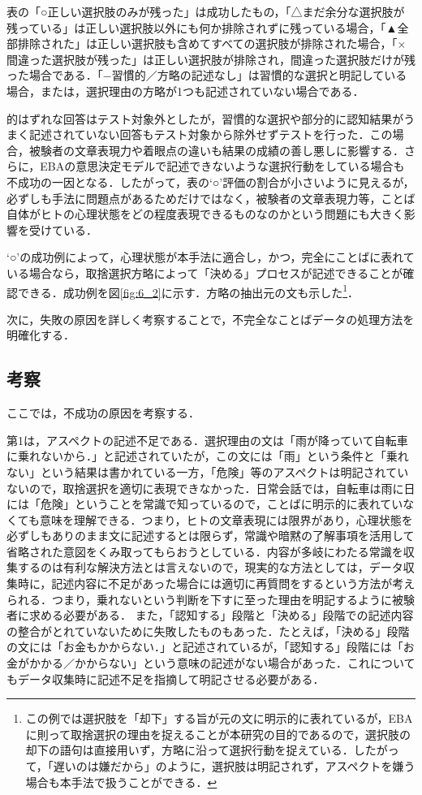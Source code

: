 \documentclass[japanese]{jnlp_1.3a}
\begin{document}
表の「○正しい選択肢のみが残った」は成功したもの，「△まだ余分な選択肢が残っている」は正しい選択肢以外にも何か排除されずに残っている場合，「▲全部排除された」は正しい選択肢も含めてすべての選択肢が排除された場合，「×間違った選択肢が残った」は正しい選択肢が排除され，間違った選択肢だけが残った場合である．「−習慣的／方略の記述なし」は習慣的な選択と明記している場合，または，選択理由の方略が1つも記述されていない場合である．

的はずれな回答はテスト対象外としたが，習慣的な選択や部分的に認知結果がうまく記述されていない回答もテスト対象から除外せずテストを行った．この場合，被験者の文章表現力や着眼点の違いも結果の成績の善し悪しに影響する．さらに，EBAの意思決定モデルで記述できないような選択行動をしている場合も不成功の一因となる．したがって，表の`○'評価の割合が小さいように見えるが，必ずしも手法に問題点があるためだけではなく，被験者の文章表現力等，ことば自体がヒトの心理状態をどの程度表現できるものなのかという問題にも大きく影響を受けている．

`○'の成功例によって，心理状態が本手法に適合し，かつ，完全にことばに表れている場合なら，取捨選択方略によって「決める」プロセスが記述できることが確認できる．成功例を図\ref{fig:6_2}に示す．方略の抽出元の文も示した\footnote{この例では選択肢を「却下」する旨が元の文に明示的に表れているが，EBAに則って取捨選択の理由を捉えることが本研究の目的であるので，選択肢の却下の語句は直接用いず，方略に沿って選択行動を捉えている．したがって，「遅いのは嫌だから」のように，選択肢は明記されず，アスペクトを嫌う場合も本手法で扱うことができる．}．

次に，失敗の原因を詳しく考察することで，不完全なことばデータの処理方法を明確化する．

\subsection{考察}
\label{sec:kousatsu}

ここでは，不成功の原因を考察する．

第1は，アスペクトの記述不足である．選択理由の文は「雨が降っていて自転車に乗れないから．」と記述されていたが，この文には「雨」という条件と「乗れない」という結果は書かれている一方，「危険」等のアスペクトは明記されていないので，取捨選択を適切に表現できなかった．日常会話では，自転車は雨に日には「危険」ということを常識で知っているので，ことばに明示的に表れていなくても意味を理解できる．つまり，ヒトの文章表現には限界があり，心理状態を必ずしもありのまま文に記述するとは限らず，常識や暗黙の了解事項を活用して省略された意図をくみ取ってもらおうとしている．内容が多岐にわたる常識を収集するのは有利な解決方法とは言えないので，現実的な方法としては，データ収集時に，記述内容に不足があった場合には適切に再質問をするという方法が考えられる．つまり，乗れないという判断を下すに至った理由を明記するように被験者に求める必要がある．
また，「認知する」段階と「決める」段階での記述内容の整合がとれていないために失敗したものもあった．たとえば，「決める」段階の文には「お金もかからない．」と記述されているが，「認知する」段階には「お金がかかる／かからない」という意味の記述がない場合があった．これについてもデータ収集時に記述不足を指摘して明記させる必要がある．
\end{document}
